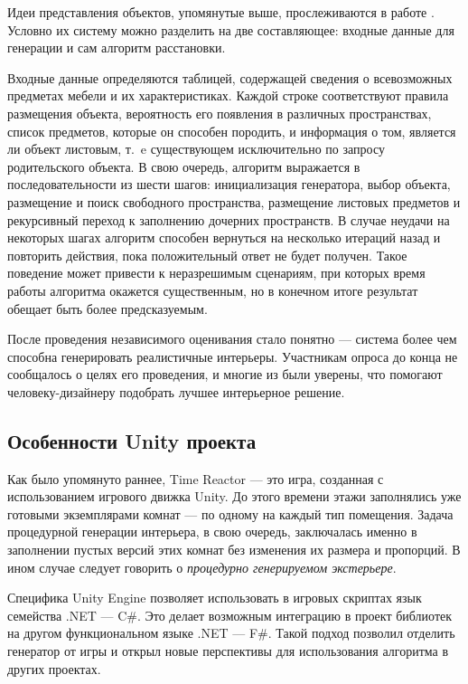 Идеи представления объектов, упомянутые выше, прослеживаются в работе \cite{lidberg2020hierarchical}. Условно их систему можно разделить на две составляющее: входные данные для генерации и сам алгоритм расстановки.

Входные данные определяются таблицей, содержащей сведения о всевозможных предметах мебели и их характеристиках.
Каждой строке соответствуют правила размещения объекта, вероятность его появления в различных пространствах, список предметов, которые он способен породить, и информация о том, является ли объект листовым, т.~e существующем исключительно по запросу родительского объекта. В свою очередь, алгоритм выражается в последовательности из шести шагов: инициализация генератора, выбор объекта, размещение и поиск свободного пространства, размещение листовых предметов и рекурсивный переход к заполнению дочерних пространств. В случае неудачи на некоторых шагах алгоритм способен вернуться на несколько итераций назад и повторить действия, пока положительный ответ не будет получен. Такое поведение может привести к неразрешимым сценариям, при которых время работы алгоритма окажется существенным, но в конечном итоге результат обещает быть более предсказуемым. 

После проведения независимого оценивания стало понятно --- система более чем способна генерировать реалистичные интерьеры. Участникам опроса до конца не сообщалось о целях его проведения, и многие из были уверены, что помогают человеку-дизайнеру подобрать лучшее интерьерное решение.

\subsection{Особенности Unity проекта}

Как было упомянуто раннее, Time Reactor --- это игра, созданная с использованием игрового движка Unity. До этого времени этажи заполнялись уже готовыми экземплярами комнат --- по одному на каждый тип помещения. Задача процедурной генерации интерьера, в свою очередь, заключалась именно в заполнении пустых версий этих комнат без изменения их размера и пропорций. В ином случае следует говорить о \textit{процедурно генерируемом экстерьере}.

Специфика Unity Engine позволяет использовать в игровых скриптах язык семейства .NET --- C\#. Это делает возможным интеграцию в проект библиотек на другом функциональном языке .NET --- F\#. Такой подход позволил отделить генератор от игры и открыл новые перспективы для использования алгоритма в других проектах.  

